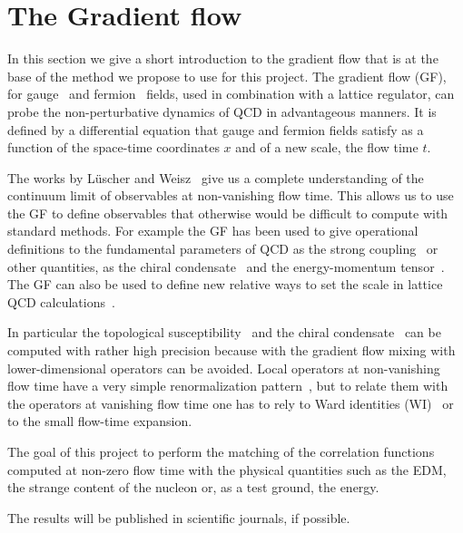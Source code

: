 \documentclass[aps,prc,twocolumn,showpacs,floatfix,nofootinbib,preprintnumbers,superscriptaddress,amsmath,amssymb]{revtex4-1}
\begin{document}
\section*{The Gradient flow}

In this section we give a short introduction to the gradient flow that is at the base of the
method we propose to use for this project.
The gradient flow (GF), for gauge~\cite{Luscher:2010iy} 
and fermion~\cite{Luscher:2013cpa} fields, used in combination with a lattice regulator, 
can probe the non-perturbative dynamics of QCD
in advantageous manners.
It is defined by a differential equation that gauge and fermion
fields satisfy as a function of the space-time coordinates $x$ and of a new
scale, the flow time $t$.

The works by L\"uscher and Weisz~\cite{Luscher:2010iy,Luscher:2011bx,Luscher:2013cpa}
give us a complete understanding of the continuum limit
of observables at non-vanishing flow time. This allows us to use the GF
to define observables that otherwise would be difficult
to compute with standard methods.
For example the GF has been used to give operational definitions to the
fundamental parameters of QCD as the strong coupling~\cite{Luscher:2010iy,Fodor:2012td,Fritzsch:2013je}
or other quantities, as the chiral condensate~\cite{Luscher:2013cpa}
and the energy-momentum tensor~\cite{Suzuki:2013gza,DelDebbio:2013zaa}.
The GF can also be used to define new relative ways to set the scale in 
lattice QCD calculations~\cite{Luscher:2010iy,Borsanyi:2012zs}.

In particular the topological susceptibility~\cite{Luscher:2010iy} and the chiral condensate~\cite{Luscher:2013cpa}
can be computed with rather high precision because with the gradient flow 
mixing with lower-dimensional operators can be avoided.
Local operators at non-vanishing flow time have a very simple renormalization pattern~\cite{Luscher:2010iy,Luscher:2011bx,Luscher:2013cpa},
but to relate them with the operators at vanishing flow time one has to rely to 
Ward identities (WI)~\cite{Luscher:2013cpa,DelDebbio:2013zaa,Shindler:2013bia} or to the small flow-time expansion.

The goal of this project to perform the matching of the correlation functions computed at non-zero
flow time with the physical quantities such as the EDM, the strange content of the nucleon 
or, as a test ground, the energy.

The results will be published in scientific journals, if possible.
\end{document}
